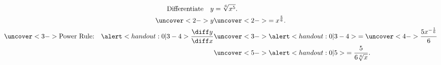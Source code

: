 \begin{frame}
\begin{example}
\abovedisplayskip=0pt
\belowdisplayskip=-15pt
\abovedisplayshortskip=0pt
\belowdisplayshortskip=0pt
\begin{align*}
\text{Differentiate}\quad y & = \sqrt[6]{x^5}.\\%
\uncover<2->{%
y %
}%
& \uncover<2->{%
 = x^{\frac{5}{6}}.
}\\%
\uncover<3->{%
\text{Power Rule:}\quad %
\alert<handout:0| 3-4>{\frac{\diff y}{\diff x}} %
}%
& \uncover<3->{%
\alert<handout:0| 3-4>{ = \uncover<4->{\frac{5 x^{-\frac{1}{6}}}{6} }}
}\\%
& \uncover<5->{%
\alert<handout:0| 5>{=  \frac{5}{6\sqrt[6]{x}}.}%
}%
\end{align*}
\end{example}
\end{frame}
